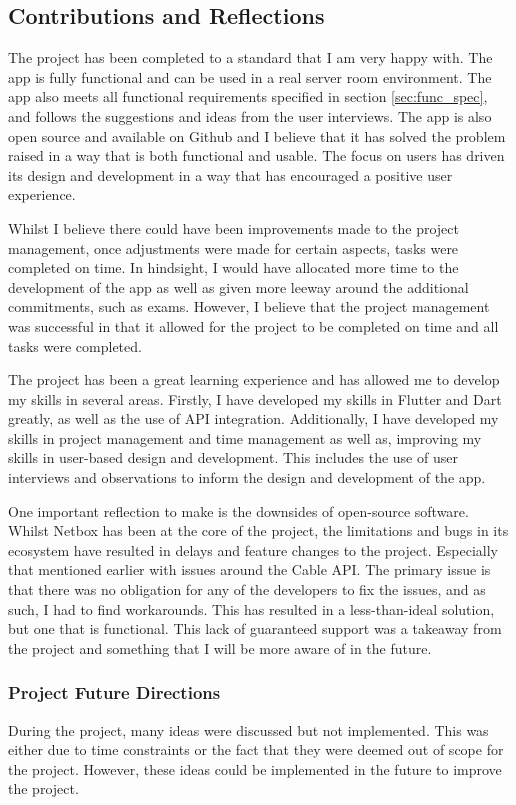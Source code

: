 \documentclass [11pt,a4paper]{article}
\begin{document}
\subsection{Contributions and Reflections}
\label{sec:reflections}

The project has been completed to a standard that I am very happy with. The app is fully functional and can be used in a real server room environment. The app also meets all functional requirements specified in section \ref{sec:func_spec}, and follows the suggestions and ideas from the user interviews. The app is also open source and available on Github \cite{keeptrackgithub} and I believe that it has solved the problem raised in a way that is both functional and usable. The focus on users has driven its design and development in a way that has encouraged a positive user experience.

Whilst I believe there could have been improvements made to the project management, once adjustments were made for certain aspects, tasks were completed on time. In hindsight, I would have allocated more time to the development of the app as well as given more leeway around the additional commitments, such as exams. However, I believe that the project management was successful in that it allowed for the project to be completed on time and all tasks were completed. 

The project has been a great learning experience and has allowed me to develop my skills in several areas. Firstly, I have developed my skills in Flutter and Dart greatly, as well as the use of API integration. Additionally, I have developed my skills in project management and time management as well as, improving my skills in user-based design and development. This includes the use of user interviews and observations to inform the design and development of the app. 

One important reflection to make is the downsides of open-source software. Whilst Netbox has been at the core of the project, the limitations and bugs in its ecosystem have resulted in delays and feature changes to the project. Especially that mentioned earlier with issues around the Cable API. The primary issue is that there was no obligation for any of the developers to fix the issues, and as such, I had to find workarounds. This has resulted in a less-than-ideal solution, but one that is functional. This lack of guaranteed support was a takeaway from the project and something that I will be more aware of in the future.


\subsubsection{Project Future Directions}
\label{sec:future_directions}
During the project, many ideas were discussed but not implemented. This was either due to time constraints or the fact that they were deemed out of scope for the project. However, these ideas could be implemented in the future to improve the project.
\end{document}
